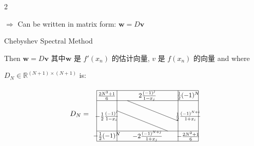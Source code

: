 \documentclass{note}
\begin{document}
\begin{multicols}{2}
{{\begin{MyTh}{}
\begin{enumerate}
            \vspace{-2pt}
            $\Rightarrow$ Can be written in matrix form: $\mathbf{w} = D \mathbf{v}$ 
        \end{enumerate}
    \end{MyTh}

    \begin{MyTh}{Chebyshev Spectral Method} \tiny

        \quad Then $\mathbf{w} = D \mathbf{v}$ 其中$\mathbf{w}$ 是 $f'(x_n)$ 的估计向量, $v$ 是 $f(x_n)$ 的向量 and  where

        \quad $D_{N}\in\mathbb{R}^{(N+1)\times (N+1)}$ is:

        \vspace{-10pt}
        \[
        \quad D_N=
        \begin{tikzpicture}[baseline=(current bounding box.center), scale=0.5]
            \draw (0,0) rectangle (10,5);
            
            \draw (2,0) -- (2,5);
            \draw (8,0) -- (8,5);
            
            \draw (0,4) -- (10,4);
            \draw (0,1) -- (10,1);
            
            \draw (3,4) -- (8,2);
            \draw (2,3) -- (7,1);
            
            \node at (1,4.5) {\scalebox{0.9}{$\frac{2N^2+1}{6}$}};
            \node at (5,4.5) {\scalebox{0.9}{$2\frac{(-1)^j}{1-x_j}$}};
            \node at (9,4.5) {\scalebox{0.9}{$\frac12(-1)^N$}};
            
            \node at (1,2.5) {\scalebox{0.9}{$-\frac12\frac{(-1)^i}{1-x_i}$}};
            \node at (9,2.5) {\scalebox{0.9}{$\frac12\frac{(-1)^{N+i}}{1+x_i}$}};
            
            \node at (1,0.5) {\scalebox{0.9}{$-\frac12(-1)^N$}};
            \node at (5,0.5) {\scalebox{0.9}{$-2\frac{(-1)^{N+j}}{1+x_j}$}};
            \node at (9,0.5) {\scalebox{0.9}{$-\frac{2N^2+1}{6}$}};
            

\end{tikzpicture}\]
\end{MyTh}}}
\end{multicols}
\end{document}
